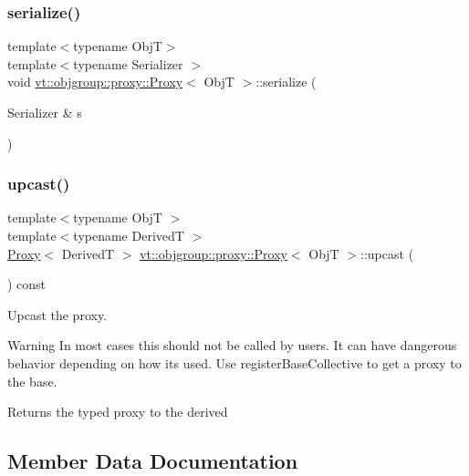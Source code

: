 \subsubsection{\texorpdfstring{serialize()}{serialize()}}
{\footnotesize\ttfamily template$<$typename ObjT$>$ \\
template$<$typename Serializer $>$ \\
void \hyperlink{structvt_1_1objgroup_1_1proxy_1_1_proxy}{vt\+::objgroup\+::proxy\+::\+Proxy}$<$ ObjT $>$\+::serialize (\begin{DoxyParamCaption}\item[{Serializer \&}]{s }\end{DoxyParamCaption})\hspace{0.3cm}{\ttfamily [inline]}}

\mbox{\label{structvt_1_1objgroup_1_1proxy_1_1_proxy_a10217747f1bdd8b59e6f5f76290de8e0}} 
\subsubsection{\texorpdfstring{upcast()}{upcast()}}
{\footnotesize\ttfamily template$<$typename ObjT $>$ \\
template$<$typename DerivedT $>$ \\
\hyperlink{structvt_1_1objgroup_1_1proxy_1_1_proxy}{Proxy}$<$ DerivedT $>$ \hyperlink{structvt_1_1objgroup_1_1proxy_1_1_proxy}{vt\+::objgroup\+::proxy\+::\+Proxy}$<$ ObjT $>$\+::upcast (\begin{DoxyParamCaption}{ }\end{DoxyParamCaption}) const}



Upcast the proxy. 

\begin{DoxyWarning}{Warning}
In most cases this should not be called by users. It can have dangerous behavior depending on how its used. Use {\ttfamily register\+Base\+Collective} to get a proxy to the base.
\end{DoxyWarning}
\begin{DoxyReturn}{Returns}
the typed proxy to the derived 
\end{DoxyReturn}


\subsection{Member Data Documentation}
\mbox{\label{structvt_1_1objgroup_1_1proxy_1_1_proxy_a4411a5c2a4719d264060041fd15d9d03}} 
